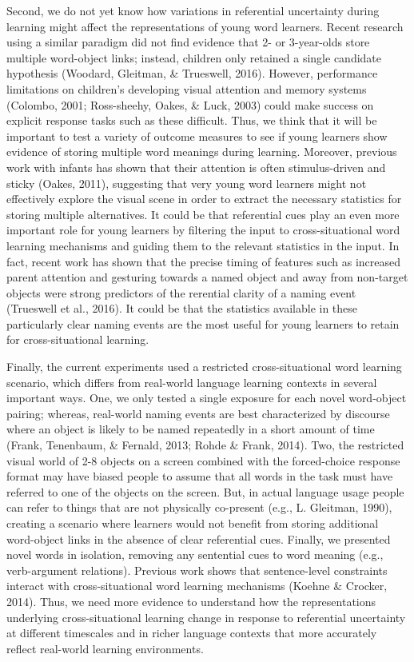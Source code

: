 \documentclass[authoryear, review]{elsarticle}
\begin{document}
Second, we do not yet know how variations in referential uncertainty
during learning might affect the representations of young word learners.
Recent research using a similar paradigm did not find evidence that 2-
or 3-year-olds store multiple word-object links; instead, children only
retained a single candidate hypothesis (Woodard, Gleitman, \& Trueswell,
2016). However, performance limitations on children's developing visual
attention and memory systems (Colombo, 2001; Ross-sheehy, Oakes, \&
Luck, 2003) could make success on explicit response tasks such as these
difficult. Thus, we think that it will be important to test a variety of
outcome measures to see if young learners show evidence of storing
multiple word meanings during learning. Moreover, previous work with
infants has shown that their attention is often stimulus-driven and
sticky (Oakes, 2011), suggesting that very young word learners might not
effectively explore the visual scene in order to extract the necessary
statistics for storing multiple alternatives. It could be that
referential cues play an even more important role for young learners by
filtering the input to cross-situational word learning mechanisms and
guiding them to the relevant statistics in the input. In fact, recent
work has shown that the precise timing of features such as increased
parent attention and gesturing towards a named object and away from
non-target objects were strong predictors of the rerential clarity of a
naming event (Trueswell et al., 2016). It could be that the statistics
available in these particularly clear naming events are the most useful
for young learners to retain for cross-situational learning.

Finally, the current experiments used a restricted cross-situational
word learning scenario, which differs from real-world language learning
contexts in several important ways. One, we only tested a single
exposure for each novel word-object pairing; whereas, real-world naming
events are best characterized by discourse where an object is likely to
be named repeatedly in a short amount of time (Frank, Tenenbaum, \&
Fernald, 2013; Rohde \& Frank, 2014). Two, the restricted visual world
of 2-8 objects on a screen combined with the forced-choice response
format may have biased people to assume that all words in the task must
have referred to one of the objects on the screen. But, in actual
language usage people can refer to things that are not physically
co-present (e.g., L. Gleitman, 1990), creating a scenario where learners
would not benefit from storing additional word-object links in the
absence of clear referential cues. Finally, we presented novel words in
isolation, removing any sentential cues to word meaning (e.g.,
verb-argument relations). Previous work shows that sentence-level
constraints interact with cross-situational word learning mechanisms
(Koehne \& Crocker, 2014). Thus, we need more evidence to understand how
the representations underlying cross-situational learning change in
response to referential uncertainty at different timescales and in
richer language contexts that more accurately reflect real-world
learning environments.
\end{document}
